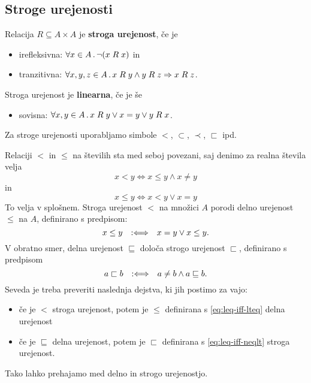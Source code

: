 \subsection{Stroge urejenosti}

\begin{definicija}
  Relacija $R \subseteq A \times A$ je \textbf{stroga urejenost}, če je
  \begin{itemize}
  \item irefleksivna: $\forall x \in A \,.\, \lnot (x \mathrel{R} x)$ in
  \item tranzitivna: $\forall x, y, z \in A \,.\, x \mathrel{R} y \land y \mathrel{R} z \Rightarrow x \mathrel{R} z$.
  \end{itemize}
  Stroga urejenost je \textbf{linearna}, če je še
  \begin{itemize}
  \item sovisna: $\forall x, y \in A \,.\, x \mathrel{R} y \lor x = y \lor y \mathrel{R} x$.
  \end{itemize}
  Za stroge urejenosti uporabljamo simbole $<$, $\subset$, $\prec$, $\sqsubset$ ipd.
\end{definicija}

Relaciji $<$ in $\leq$ na številih sta med seboj povezani, saj denimo za realna števila velja
%
\begin{equation*}
  x < y \iff x \leq y \land x \neq y
\end{equation*}
%
in
%
\begin{equation}
  \label{eq:leq-iff-lteq}
  x \leq y \iff x < y \lor x = y
\end{equation}
%
To velja v splošnem. Stroga urejenost $<$ na množici $A$ porodi delno urejenost $\leq$ na $A$,
definirano s predpisom:
%
\begin{equation*}
    x \leq y  \quad {{:}{\Longleftrightarrow}}\quad x = y \lor x \leq y.
\end{equation*}
%
V obratno smer, delna urejenost $\sqsubseteq$ določa strogo urejenost $\sqsubset$, definirano s predpisom
%
\begin{equation}
  \label{eq:leq-iff-neqlt}
  a \sqsubset b  \quad {{:}{\Longleftrightarrow}}\quad  a \neq b \land a \sqsubseteq b.
\end{equation}
%
Seveda je treba preveriti naslednja dejstva, ki jih postimo za vajo:
%
\begin{itemize}
\item če je $<$ stroga urejenost, potem je $\leq$ definirana s \eqref{eq:leq-iff-lteq} delna urejenost
\item če je $\sqsubseteq$ delna urejenost, potem je $\sqsubset$ definirana s \eqref{eq:leq-iff-neqlt} stroga urejenost.
\end{itemize}
%
Tako lahko prehajamo med delno in strogo urejenostjo.

